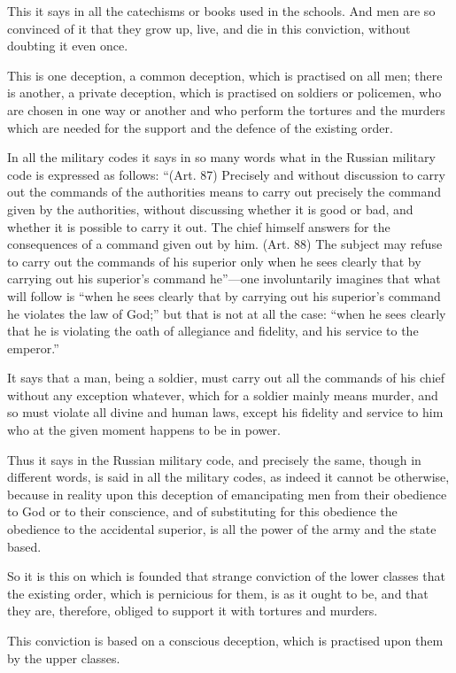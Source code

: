 \documentclass{book}
\begin{document}
This it says in all the catechisms or books used in the schools. And men are so convinced of it that they grow up, live, and die in this conviction, without doubting it even once.

This is one deception, a common deception, which is practised on all men; there is another, a private deception, which is practised on soldiers or policemen, who are chosen in one way or another and who perform the tortures and the murders which are needed for the support and the defence of the existing order.

In all the military codes it says in so many words what in the Russian military code is expressed as follows: “(Art. 87) Precisely and without discussion to carry out the commands of the authorities means to carry out precisely the command given by the authorities, without discussing whether it is good or bad, and whether it is possible to carry it out. The chief himself answers for the consequences of a command given out by him. (Art. 88) The subject may refuse to carry out the commands of his superior only when he sees clearly that by carrying out his superior’s command he”—one involuntarily imagines that what will follow is “when he sees clearly that by carrying out his superior’s command he violates the law of God;” but that is not at all the case: “when he sees clearly that he is violating the oath of allegiance and fidelity, and his service to the emperor.”

It says that a man, being a soldier, must carry out all the commands of his chief without any exception whatever, which for a soldier mainly means murder, and so must violate all divine and human laws, except his fidelity and service to him who at the given moment happens to be in power.

Thus it says in the Russian military code, and precisely the same, though in different words, is said in all the military codes, as indeed it cannot be otherwise, because in reality upon this deception of emancipating men from their obedience to God or to their conscience, and of substituting for this obedience the obedience to the accidental superior, is all the power of the army and the state based.

So it is this on which is founded that strange conviction of the lower classes that the existing order, which is pernicious for them, is as it ought to be, and that they are, therefore, obliged to support it with tortures and murders.

This conviction is based on a conscious deception, which is practised upon them by the upper classes.
\end{document}
